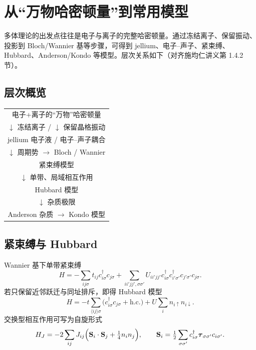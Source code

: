 \section{从“万物哈密顿量”到常用模型}

多体理论的出发点往往是电子与离子的完整哈密顿量。通过冻结离子、保留振动、投影到 Bloch/Wannier 基等步骤，可得到 jellium、电子–声子、紧束缚、Hubbard、Anderson/Kondo 等模型。层次关系如下（对齐施均仁讲义第 1.4.2 节）。

\subsection{层次概览}

\begin{center}
\begin{tabular}{c}
电子+离子的“万物”哈密顿量\\
$\downarrow$ 冻结离子 / $\downarrow$ 保留晶格振动\\
jellium 电子液 \qquad / \qquad 电子–声子耦合\\
$\downarrow$ 周期势 $\to$ Bloch / Wannier\\
紧束缚模型\\
$\downarrow$ 单带、局域相互作用\\
Hubbard 模型\\
$\downarrow$ 杂质极限\\
Anderson 杂质 $\to$ Kondo 模型
\end{tabular}
\end{center}

\subsection{紧束缚与 Hubbard}

Wannier 基下单带紧束缚
\begin{equation}
  H=-\sum_{ij\sigma}t_{ij}c_{i\sigma}^\dagger c_{j\sigma}
  +\sum_{ii'jj',\sigma\sigma'}
  U_{ii'jj'}
  c_{i\sigma}^\dagger c_{i'\sigma'}^\dagger
  c_{j'\sigma'}c_{j\sigma}.
\end{equation}
若只保留近邻跃迁与同址排斥，即得 Hubbard 模型
\begin{equation}
  H=-t\sum_{\langle ij\rangle\sigma}
  \bigl(c_{i\sigma}^\dagger c_{j\sigma}+\mathrm{h.c.}\bigr)
  +U\sum_i n_{i\uparrow}n_{i\downarrow}.
\label{eq:hubbard}
\end{equation}
交换型相互作用可写为自旋形式
\begin{equation}
  H_J=-2\sum_{ij}J_{ij}
  \Bigl(
  \mathbf{S}_i\cdot\mathbf{S}_j+\tfrac14 n_i n_j
  \Bigr),
  \qquad
  \mathbf{S}_i=\tfrac12\sum_{\sigma\sigma'}
  c_{i\sigma}^\dagger\boldsymbol{\tau}_{\sigma\sigma'}c_{i\sigma'}.
\end{equation}

